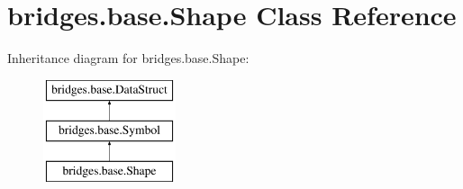 \hypertarget{classbridges_1_1base_1_1_shape}{}\section{bridges.\+base.\+Shape Class Reference}
\label{classbridges_1_1base_1_1_shape}
Inheritance diagram for bridges.\+base.\+Shape\+:\begin{figure}[H]
\begin{center}
\leavevmode
\includegraphics[height=3.000000cm]{classbridges_1_1base_1_1_shape}
\end{center}
\end{figure}
